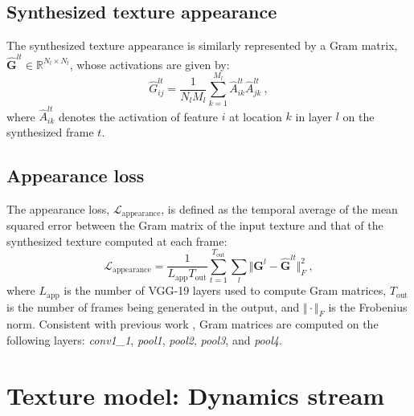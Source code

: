 \subsection{Synthesized texture appearance}

The synthesized texture appearance is similarly represented by a
Gram matrix, $\hat{\mathbf{G}}^{lt} \in \mathbb{R}^{N_l \times N_l}$,
whose activations are given by:
\begin{equation}
	\hat{G}_{ij}^{lt} = \frac{1}{N_l M_l} \sum_{k=1}^{M_l} \hat{A}_{ik}^{lt} \hat{A}_{jk}^{lt}\ ,
	\label{eq:gram_synthesized}	
\end{equation}
where $\hat{A}_{ik}^{lt}$ denotes the activation of feature $i$ at
location $k$ in layer $l$ on the synthesized frame $t$.

\subsection{Appearance loss}

The appearance loss, $\mathcal{L}_\text{appearance}$, is defined as the temporal average of the mean squared error between
the Gram matrix of the input texture and that of the synthesized
texture computed at each frame:
\begin{equation}
   \mathcal{L}_\text{appearance} = \frac{1}{L_\text{app} T_\text{out}} \sum_{t=1}^{T_\text{out}} \sum_{l} \Vert \mathbf{G}^l - \hat{\mathbf{G}}^{lt} \Vert^2_F\ ,
   \label{eq:apploss}
\end{equation}
where $L_\text{app}$ is the number of VGG-19 layers used to compute Gram
matrices, $T_\text{out}$ is the number of frames being generated in
the output, and $\Vert \cdot \Vert_F$ is the Frobenius norm.
Consistent with previous work \cite{gatys2015}, Gram matrices are computed on the
following layers: 
\emph{conv1\_1}, \emph{pool1}, \emph{pool2}, \emph{pool3}, and \emph{pool4}. 

\section{Texture model: Dynamics stream}

